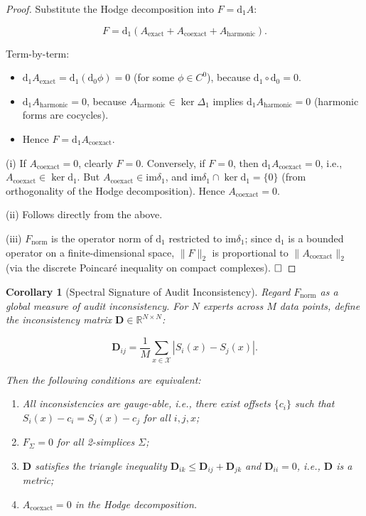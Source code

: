 \documentclass[12pt,a4paper]{article}
\theoremstyle{plain}
\newtheorem{corollary}[theorem]{Corollary}
\theoremstyle{definition}
\theoremstyle{remark}
\newcommand{\R}{\mathbb{R}}
\newcommand{\im}{\mathrm{im}}
\newcommand{\dd}{\mathrm{d}}
\newcommand{\norm}[1]{\|#1\|}
\begin{document}
\begin{proof}
Substitute the Hodge decomposition into $F = \dd_1 A$:

\[
F = \dd_1(A_{\mathrm{exact}} + A_{\mathrm{coexact}} + A_{\mathrm{harmonic}}).
\]

Term-by-term:
\begin{itemize}
    \item $\dd_1 A_{\mathrm{exact}} = \dd_1(\dd_0 \phi) = 0$ (for some $\phi \in C^0$), because $\dd_1 \circ \dd_0 = 0$.
    \item $\dd_1 A_{\mathrm{harmonic}} = 0$, because $A_{\mathrm{harmonic}} \in \ker \Delta_1$ implies $\dd_1 A_{\mathrm{harmonic}} = 0$ (harmonic forms are cocycles).
    \item Hence $F = \dd_1 A_{\mathrm{coexact}}$.
\end{itemize}

(i) If $A_{\mathrm{coexact}} = 0$, clearly $F = 0$. Conversely, if $F = 0$, then $\dd_1 A_{\mathrm{coexact}} = 0$, i.e., $A_{\mathrm{coexact}} \in \ker \dd_1$. But $A_{\mathrm{coexact}} \in \im \delta_1$, and $\im \delta_1 \cap \ker \dd_1 = \{0\}$ (from orthogonality of the Hodge decomposition). Hence $A_{\mathrm{coexact}} = 0$.

(ii) Follows directly from the above.

(iii) $F_{\mathrm{norm}}$ is the operator norm of $\dd_1$ restricted to $\im \delta_1$; since $\dd_1$ is a bounded operator on a finite-dimensional space, $\norm{F}_2$ is proportional to $\norm{A_{\mathrm{coexact}}}_2$ (via the discrete Poincar\'e inequality on compact complexes). $\hfill\square$
\end{proof}

\begin{corollary}[Spectral Signature of Audit Inconsistency]
\label{cor:spectral}
Regard $F_{\mathrm{norm}}$ as a global measure of audit inconsistency. For $N$ experts across $M$ data points, define the inconsistency matrix $\mathbf{D} \in \R^{N \times N}$:

\begin{equation}\label{eq:D_matrix}
    \mathbf{D}_{ij} = \frac{1}{M} \sum_{x \in \mathcal{X}} |S_i(x) - S_j(x)|.
\end{equation}

Then the following conditions are equivalent:
\begin{enumerate}[label=(\roman*), leftmargin=*]
    \item All inconsistencies are gauge-able, i.e., there exist offsets $\{c_i\}$ such that $S_i(x) - c_i = S_j(x) - c_j$ for all $i,j,x$;
    \item $F_\Sigma = 0$ for all 2-simplices $\Sigma$;
    \item $\mathbf{D}$ satisfies the triangle inequality $\mathbf{D}_{ik} \leq \mathbf{D}_{ij} + \mathbf{D}_{jk}$ and $\mathbf{D}_{ii} = 0$, i.e., $\mathbf{D}$ is a metric;
    \item $A_{\mathrm{coexact}} = 0$ in the Hodge decomposition.
\end{enumerate}
\end{corollary}
\end{document}
